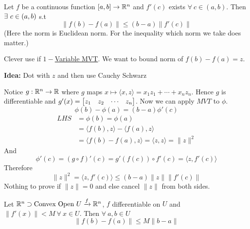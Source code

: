 \begin{theorem}{}{}
	Let $f$ be a continuous function $[a,b]\to \mathbb{R}^n$ and $f'(c)$ exists $\forall\ c\in(a,b)$. Then $\exists\ c\in (a,b)$ s.t $$\|f(b)-f(a)\|\leq (b-a)\|f'(c)\|$$(Here the norm is Euclidean norm. For the inequality which norm we take does matter.)
\end{theorem}
\begin{myproof}
	Clever use if \hyperref[th:1varmvt]{$1-$Variable MVT}. We want to bound norm of $f(b)-f(a)=z$.\parinf

	\textbf{Idea: }Dot with $z$ and then use Cauchy Schwarz \parinn
	\begin{center}
	\end{center}
	Notice $g: \mathbb{R}^n\to\mathbb{R}$ where $g$ maps $x\longmapsto \langle x,z\rangle=x_1z_1+\cdots+x_nz_n$. Hence $g$ is differentiable and $g'(x)=\left[ \begin{matrix} z_1 & z_2 & \cdots & z_n\end{matrix}\right]$. Now we can apply $MVT$ to $\phi$. $$\phi(b)-\phi(a)=(b-a)\phi'(c)$$\begin{align*}
		LHS & =\phi(b)=\phi(a)\\
		& =\langle f(b),z\rangle -\langle f(a),z\rangle\\
		&=\langle f(b)-f(a),z\rangle=\langle z,z\rangle=\|z\|^2
	\end{align*}And$$\phi'(c)=(g\circ f)'(c)=g'(f(c))\circ f'(c)=\langle z ,f'(c)\rangle$$Therefore$$\|z\|^2=\langle z,f'(c)\rangle\leq (b-a)\|z\|\|f'(c)\|$$Nothing to prove if $\|z\|=0$ and else cancel $\|z\|$ from both sides.
\end{myproof}
\begin{theorem}{}{}
	Let $\mathbb{R}^n\supset \text{Convex Open }U\xrightarrow{f}\mathbb{R}^n$, $ f$ differentiable on $U$ and $ \|f'(x)\|<M \ \forall\ x\in U$. Then $\forall\ a,b\in U$ $$\|f(b)-f(a)\|\leq M\|b-a\|$$
\end{theorem}
